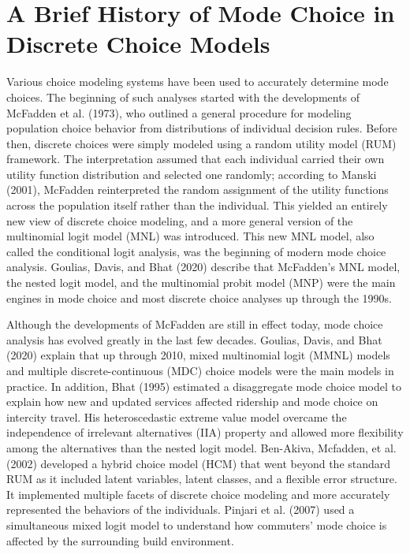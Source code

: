 \documentclass[12pt, oneside, openright]{byuthesis}
\begin{document}
\hypertarget{lit2}{%
\section{A Brief History of Mode Choice in Discrete Choice Models}\label{lit2}}

Various choice modeling systems have been used to accurately determine mode choices. The beginning of such analyses started with the developments of McFadden et al. (1973), who outlined a general procedure for modeling population choice behavior from distributions of individual decision rules. Before then, discrete choices were simply modeled using a random utility model (RUM) framework. The interpretation assumed that each individual carried their own utility function distribution and selected one randomly; according to Manski (2001), McFadden reinterpreted the random assignment of the utility functions across the population itself rather than the individual. This yielded an entirely new view of discrete choice modeling, and a more general version of the multinomial logit model (MNL) was introduced. This new MNL model, also called the conditional logit analysis, was the beginning of modern mode choice analysis. Goulias, Davis, and Bhat (2020) describe that McFadden's MNL model, the nested logit model, and the multinomial probit model (MNP) were the main engines in mode choice and most discrete choice analyses up through the 1990s.

Although the developments of McFadden are still in effect today, mode choice analysis has evolved greatly in the last few decades. Goulias, Davis, and Bhat (2020) explain that up through 2010, mixed multinomial logit (MMNL) models and multiple discrete-continuous (MDC) choice models were the main models in practice. In addition, Bhat (1995) estimated a disaggregate mode choice model to explain how new and updated services affected ridership and mode choice on intercity travel. His heteroscedastic extreme value model overcame the independence of irrelevant alternatives (IIA) property and allowed more flexibility among the alternatives than the nested logit model. Ben-Akiva, Mcfadden, et al. (2002) developed a hybrid choice model (HCM) that went beyond the standard RUM as it included latent variables, latent classes, and a flexible error structure. It implemented multiple facets of discrete choice modeling and more accurately represented the behaviors of the individuals. Pinjari et al. (2007) used a simultaneous mixed logit model to understand how commuters' mode choice is affected by the surrounding build environment.
\end{document}
